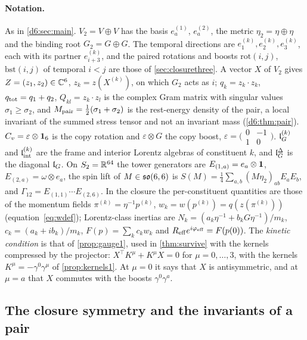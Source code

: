 \paragraph{Notation.} As in \cref{d6:sec:main}. $V_2=V\oplus V$ has the basis $e^{(1)}_a$, $e^{(2)}_a$, the metric $\eta_2=\eta\oplus\eta$ and
the binding root $G_2=G\oplus G$. The temporal directions are $e^{(k)}_1,e^{(k)}_2,e^{(k)}_3$, each with its partner $e^{(k)}_{i+3}$, and the
paired rotations and boosts $\mathrm{rot}(i,j)$, $\mathrm{bst}(i,j)$ of temporal $i<j$ are those of \cref{sec:closurethree}. A vector $X$ of
$V_2$ gives $Z=(z_1,z_2)\in\mathbb{C}^6$, $z_k=z(X^{(k)})$, on which $G_2$ acts as $i$; $q_k=z_k\cdot z_k$, $q_{\rm tot}=q_1+q_2$, $Q_{kl}=z_k\cdot z_l$ is the
complex Gram matrix with singular values $\sigma_1\ge\sigma_2$, and $M_{\rm pair}=\tfrac12(\sigma_1+\sigma_2)$ is the rest-energy density of the pair, a local
invariant of the summed stress tensor and not an invariant mass (\cref{d6:thm:pair}). $C_v=\varepsilon\otimes\mathbf 1_6$ is the copy rotation and $\varepsilon\otimes G$ the copy boost,
$\varepsilon=\bigl(\begin{smallmatrix}0&-1\\1&0\end{smallmatrix}\bigr)$. $\mathfrak l_G^{(k)}$ and $\mathfrak l_{\rm int}^{(k)}$ are the frame and interior Lorentz
algebras of constituent $k$, and $\mathfrak l_G^\Delta$ is the diagonal $\mathfrak l_G$. On $S_2=\mathbb{R}^{64}$ the tower generators are $E_{(1,a)}=e_a\otimes\mathbf 1$,
$E_{(2,a)}=\omega\otimes e_a$, the spin lift of $M\in\mathfrak{so}(6,6)$ is $S(M)=\tfrac14\sum_{a,b}(M\eta_2)_{ab}E_aE_b$, and $\Gamma_{12}=E_{(1,1)}\cdots E_{(2,6)}$.
In the closure the per-constituent quantities are those of the momentum fields $\pi^{(k)}=\eta^{-1}p^{(k)}$, $w_k=w(p^{(k)})=q(z(\pi^{(k)}))$
(equation~\cref{eq:wdef}); Lorentz-class inertias are $N_k=(a_k\eta^{-1}+b_kG\eta^{-1})/m_k$, $c_k=(a_k+ib_k)/m_k$, $F(p)=\sum_kc_kw_k$ and
$R_{\rm eff}e^{i\varphi_{\rm eff}}=F(p(0))$. The \emph{kinetic condition} is that of \cref{prop:gauge1}, used in \cref{thm:survive}
with the kernels compressed by the projector: $X^{\!\top}K^\mu+K^\mu X=0$ for $\mu=0,\dots,3$, with the kernels $K^\mu=-\gamma^0\gamma^\mu$ of \cref{prop:kernels1}. At $\mu=0$ it says that $X$ is antisymmetric, and at $\mu=a$ that $X$ commutes with the boosts $\gamma^0\gamma^a$.

\subsection{The closure symmetry and the invariants of a pair}
\label{e5:sec:symmetry}

